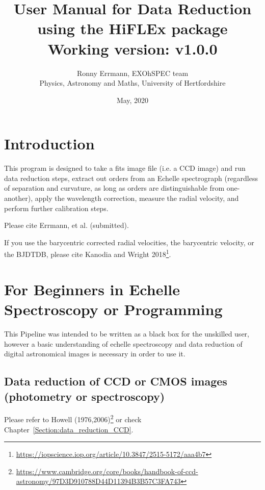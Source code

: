 \documentclass[10pt,a4paper]{article}
\title{User Manual for Data Reduction using the HiFLEx package\\ Working version: v1.0.0}
\date{May, 2020}
\author{Ronny Errmann, EXOhSPEC team\\ Physics, Astronomy and Maths, University of Hertfordshire}
\begin{document}
\maketitle

\tableofcontents
{}


\newpage


\section{Introduction}
\label{intro}

This program is designed to take a fits image file (i.e. a CCD image) and run data reduction steps, extract out orders from an Echelle spectrograph (regardless of separation and curvature, as long as orders are distinguishable from one-another), apply the wavelength correction, measure the radial velocity, and perform further calibration steps.

Please cite Errmann, et al. (submitted).

If you use the barycentric corrected radial velocities, the barycentric velocity, or the BJDTDB, please cite Kanodia and Wright 2018\footnote{\url{https://iopscience.iop.org/article/10.3847/2515-5172/aaa4b7}}.




\section{For Beginners in Echelle Spectroscopy or Programming}

This Pipeline was intended to be written as a black box for the unskilled user, however a basic understanding of echelle spectroscopy and data reduction of digital astronomical images is necessary in order to use it.


\subsection{Data reduction of CCD or CMOS images (photometry or spectroscopy)}
Please refer to Howell (1976,2006)\footnote{\url{https://www.cambridge.org/core/books/handbook-of-ccd-astronomy/97D3D910788D44D11394B3B57C3FA743}} or check Chapter~\ref{Section:data_reduction_CCD}.
\end{document}
